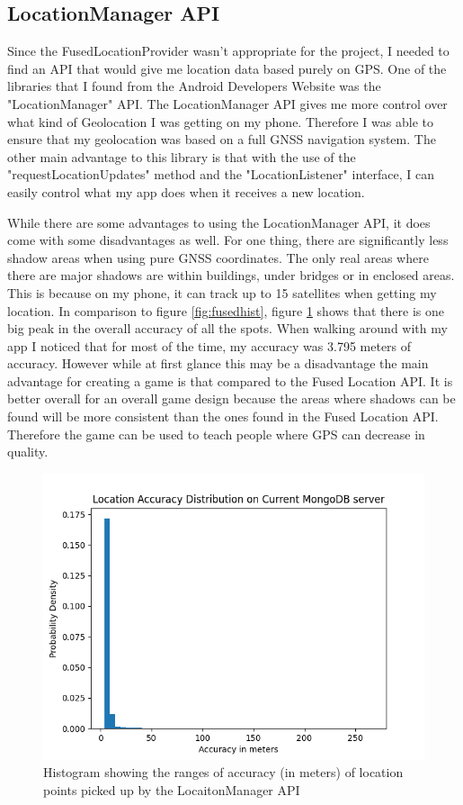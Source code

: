 \documentclass{l4proj}
\begin{document}
\subsection{LocationManager API}
\label{locationManager}
Since the FusedLocationProvider wasn't appropriate for the project, I needed to find an API that would give me location data based purely on GPS. One of the libraries that I found
from the Android Developers Website was the "LocationManager" API. The LocationManager API gives me more control over what kind of Geolocation I was getting on my phone. Therefore
I was able to ensure that my geolocation was based on a full GNSS navigation system. \citep{locationManager} The other main advantage to this library is that with the use of the "requestLocationUpdates" method and
the "LocationListener" interface, I can easily control what my app does when it receives a new location.

While there are some advantages to using the LocationManager API, it does come with some disadvantages as well. For one thing, there are significantly less shadow areas when using
pure GNSS coordinates. The only real areas where there are major shadows are within buildings, under bridges or in enclosed areas. This is because on my phone, it can track up to 
15 satellites when getting my location. In comparison to figure \ref{fig:fusedhist}, figure \ref{fig:mongohist} shows that there is one big peak in the overall accuracy of all the spots.
When walking around with my app I noticed that for most of the time, my accuracy was 3.795 meters of accuracy. However while at first glance this may be a disadvantage the main advantage for creating a
game is that compared to the Fused Location API. It is better overall for an overall game design because the areas where shadows can be found will be more consistent than the ones
found in the Fused Location API. Therefore the game can be used to teach people where GPS can decrease in quality.

\begin{figure}
    \centering
    \includegraphics[width=0.6\linewidth]{images/mongo_db_histogram.png}

    \caption{Histogram showing the ranges of accuracy (in meters) of location points picked up by the LocaitonManager API}

    \label{fig:mongohist}
\end{figure}
\end{document}
